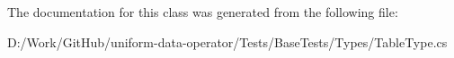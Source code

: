 The documentation for this class was generated from the following file\+:\begin{DoxyCompactItemize}
\item 
D\+:/\+Work/\+Git\+Hub/uniform-\/data-\/operator/\+Tests/\+Base\+Tests/\+Types/Table\+Type.\+cs\end{DoxyCompactItemize}
